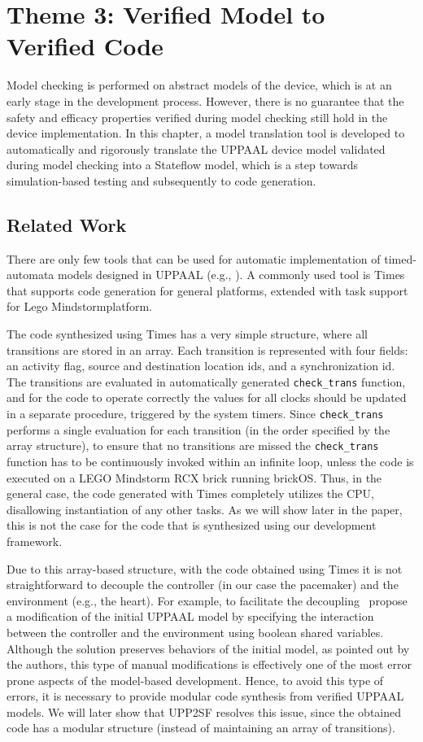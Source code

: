 \chapter{Theme 3: Verified Model to Verified Code}
Model checking is performed on abstract models of the device, which is at an early stage in the development process. 
However, there is no guarantee that the safety and efficacy properties verified during model checking still hold in the device implementation.
In this chapter, a model translation tool is developed to automatically and rigorously translate the UPPAAL device model validated during model checking into a Stateflow model, which is a step towards simulation-based testing and subsequently to code generation. 

\section{Related Work}
\label{sec:code_gen}
There are only few tools that can be used for automatic implementation of timed-automata models designed in UPPAAL (e.g., \cite{times,up2nqc}). A commonly used tool is Times~\cite{times} that supports code generation for general platforms, extended with task support for {Lego Mindstorm}\texttrademark  platform. 

The code synthesized using Times has a very simple structure, where all transitions are stored in an array. Each transition is represented with four fields: an activity flag, source and destination location ids, and a synchronization id. The transitions are evaluated in automatically generated \texttt{check\_trans} function, and for the code to operate correctly the values for all clocks should be updated in a separate procedure, triggered by the system timers. Since \texttt{check\_trans} performs a single evaluation for each transition (in the order specified by the array structure), to ensure that no transitions are missed the \texttt{check\_trans} function has to be continuously invoked within an infinite loop, unless the code is executed on a LEGO Mindstorm RCX brick running brickOS. Thus, in the general case, the code generated with Times completely utilizes the CPU, disallowing instantiation of any other tasks. As we will show later in the paper, this is not the case for the code that is synthesized using our development framework.

Due to this array-based structure, with the code obtained using Times it is not straightforward to decouple the controller (in our case the pacemaker) and the environment (e.g., the heart). For example, to facilitate the decoupling~\cite{kim_emsoft11} propose a modification of the initial UPPAAL model by specifying the interaction between the controller and the environment using boolean shared variables. 
Although the solution preserves behaviors of the initial model, as pointed out by the authors, this type of manual modifications is effectively one of the most error prone aspects of the model-based development. Hence, to avoid this type of errors, it is necessary to provide modular code synthesis from verified UPPAAL models. We will later show  that UPP2SF resolves this issue, since the obtained code has a modular structure (instead of maintaining an array of transitions).

